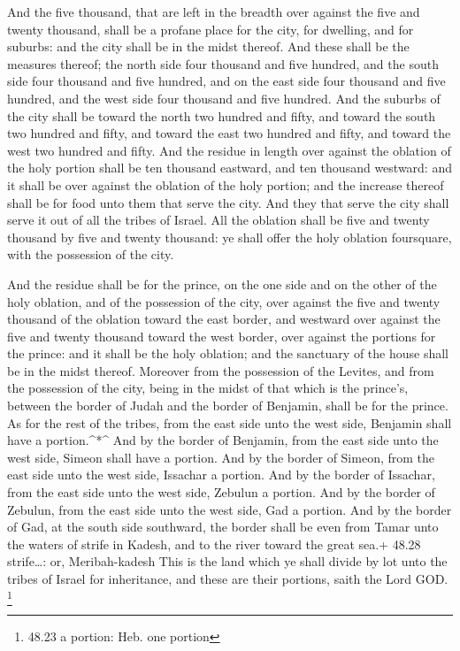  And the five thousand, that are left in the breadth over
against the five and twenty thousand, shall be a profane place for the
city, for dwelling, and for suburbs: and the city shall be in the midst
thereof.  And these shall be the measures thereof; the
north side four thousand and five hundred, and the south side four
thousand and five hundred, and on the east side four thousand and five
hundred, and the west side four thousand and five hundred. 
And the suburbs of the city shall be toward the north two hundred and
fifty, and toward the south two hundred and fifty, and toward the east
two hundred and fifty, and toward the west two hundred and fifty.
 And the residue in length over against the oblation of the
holy portion shall be ten thousand eastward, and ten thousand westward:
and it shall be over against the oblation of the holy portion; and the
increase thereof shall be for food unto them that serve the city.
 And they that serve the city shall serve it out of all the
tribes of Israel.  All the oblation shall be five and
twenty thousand by five and twenty thousand: ye shall offer the holy
oblation foursquare, with the possession of the city.

 And the residue shall be for the prince, on the one side
and on the other of the holy oblation, and of the possession of the
city, over against the five and twenty thousand of the oblation toward
the east border, and westward over against the five and twenty thousand
toward the west border, over against the portions for the prince: and it
shall be the holy oblation; and the sanctuary of the house shall be in
the midst thereof.  Moreover from the possession of the
Levites, and from the possession of the city, being in the midst of that
which is the prince's, between the border of Judah and the border of
Benjamin, shall be for the prince.  As for the rest of the
tribes, from the east side unto the west side, Benjamin shall have a
portion.\^{}*\^{}  And by the border of Benjamin, from the
east side unto the west side, Simeon shall have a portion. 
And by the border of Simeon, from the east side unto the west side,
Issachar a portion.  And by the border of Issachar, from
the east side unto the west side, Zebulun a portion.  And
by the border of Zebulun, from the east side unto the west side, Gad a
portion.  And by the border of Gad, at the south side
southward, the border shall be even from Tamar unto the waters of strife
in Kadesh, and to the river toward the great sea.+ 48.28 strife\ldots:
or, Meribah-kadesh  This is the land which ye shall divide
by lot unto the tribes of Israel for inheritance, and these are their
portions, saith the Lord GOD. \footnote{48.23 a portion: Heb. one
  portion}

